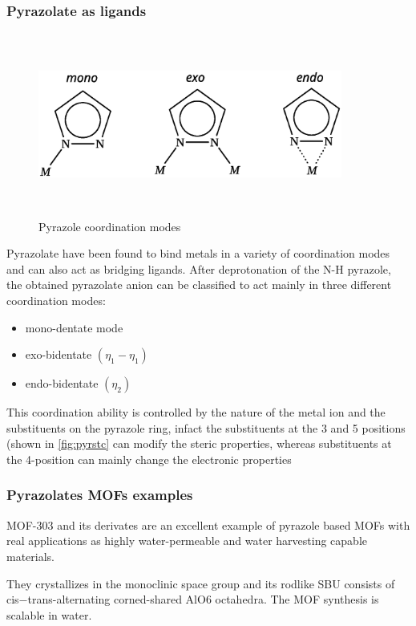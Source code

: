 \documentclass[../Master.tex]{subfiles}
\begin{document}
\subsubsection{Pyrazolate as ligands}
\begin{figure}[h]
	\centering
	\includegraphics[width=10cm,height=6cm,keepaspectratio]{Structures/pyrazolecordmode.eps}
	\caption{Pyrazole coordination modes}\label{fig:pyrazole-cord-mode}
\end{figure}
Pyrazolate have been found to bind metals in a variety of coordination modes and can also act as bridging ligands.
After deprotonation of the N-H pyrazole, the obtained pyrazolate anion can be classified to act mainly in three different coordination modes:
\begin{itemize}
	\item  mono-dentate mode
	\item exo-bidentate \((\eta_{1}-\eta_{1})\)
	\item endo-bidentate \((\eta_{2})\)
\end{itemize}
This coordination ability is controlled by the nature of the metal ion and the substituents on the pyrazole ring, infact the substituents at the 3 and 5 positions (shown in \ref{fig:pyrstc} can modify the steric properties, whereas substituents at the 4-position can mainly change the electronic properties

\subsubsection{Pyrazolates MOFs examples}
MOF-303 and its derivates are an excellent example of pyrazole based MOFs with real applications as highly water-permeable\cite{cong_highly_2021} and water harvesting\cite{zheng_broadly_2022} capable materials.

They crystallizes in the monoclinic space group and its rodlike SBU consists of cis−trans-alternating corned-shared AlO6 octahedra.
The MOF synthesis is scalable in water.
\end{document}
